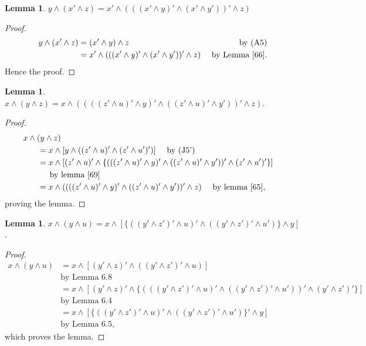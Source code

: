 \documentclass{amsart}
\theoremstyle{plain}
\newtheorem{lemma}[theorem]{Lemma}
\theoremstyle{problem}
\theoremstyle{definition}
\theoremstyle{remark}
\numberwithin{equation}{section}
\begin{document}
  
\begin{lemma} \label{69} 
$y \land (x' \land z)= x' \land (((x' \land y)' \land (x' \land y'))' \land z)$\\
\end{lemma}

\begin{proof}
\begin{align*}
y \land (x' \land z) &= (x' \land y) \land z  &\text{ by (A5)}\\  
&= x' \land (((x' \land y)' \land (x' \land y'))' \land z) &\text{ by Lemma \ref{66}}.  
\end{align*}
Hence the proof.
\end{proof}



\begin{lemma} \label{189} 
    $x \land (y \land z) = x \land ((((z' \land u)' \land y)' \land ((z' \land u)' \land y'))' \land z).$
\end{lemma}

\begin{proof}     
\begin{align*}  
x \land (y \land z) \\                                              
 &\hspace{-1cm} = x \land [y \land ((z' \land u)' \land (z' \land u')')] \quad \text{ by (J5')}\\
&\hspace{-1cm}  = x \land [(z' \land u)' \land  \{(((z' \land u)' \land y)' \land ((z' \land u)'  \land y'))' \land (z' \land u')'\}] \\ 
&\hspace{-.6cm} \text{ by lemma \ref{69}}\\                                             
&\hspace{-1cm}  =x \land ((((z' \land u)' \land y)' \land ((z' \land u)' \land y'))' \land z) \quad \text{ by lemma \ref{65}},
 \end{align*} 
 proving the lemma.
\end{proof}
   

\begin{lemma} \label{810} 
    $x \land (y \land u) = x \land [\{((y' \land z')' \land u)' \land ((y' \land z')' \land u')\} \land y]  $.
\end{lemma}
\begin{proof}
\begin{align*}
             x \land (y \land u)    
              &= x \land [(y' \land z)' \land ((y' \land z')' \land u)]\\  &\text{by Lemma 6.8} \\    
          &= x \land [(y' \land z)' \land \{(((y' \land z')' \land u)' \land ((y' \land z')' \land u'))' \land (y' \land z')'\}]\\  &\text{by Lemma 6.4}\\ 
          &= x \land [\{((y' \land z')' \land u)' \land ((y' \land z')' \land u')\}' \land y]\\  &\text{by Lemma 6.5},   
\end{align*}
which proves the lemma.
\end{proof}
\end{document}
